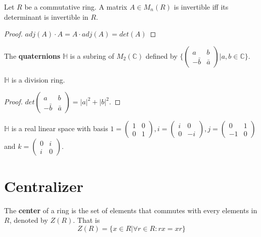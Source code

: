 \documentclass[12pt]{book}
\begin{document}
\begin{lemma}
	Let $R$ be a commutative ring. A matrix $A\in M_n(R)$ is invertible iff its determinant is invertible in $R$.
\end{lemma}
\begin{proof}
	$adj(A)\cdot A=A \cdot adj(A)=det(A)$
\end{proof}

\begin{example}
	The {\bf quaternions} $\mathbb H$ is a subring of $M_2(\mathbb C)$ defined by $\{\begin{pmatrix}
		a&b\\-\bar b&\bar a
	\end{pmatrix}|a,b\in\mathbb C\}$.
\end{example}

\begin{lemma}
	$\mathbb H$ is a division ring.
\end{lemma}
\begin{proof}
	$det \begin{pmatrix}
		a&b\\-\bar b&\bar a
	\end{pmatrix}=|a|^2+|b|^2$.
\end{proof}

\begin{lemma}
	$\mathbb H$ is a real linear space with basis $1=\begin{pmatrix}1&0\\0&1\end{pmatrix}, i=\begin{pmatrix}i&0\\0&-i\end{pmatrix}, j=\begin{pmatrix}0&1\\-1&0\end{pmatrix}$ and $k=\begin{pmatrix}0&i\\i&0\end{pmatrix}$.
\end{lemma}

\section{Centralizer}

\begin{definition}
	The \textbf{center} of a ring is the set of elements that commutes with every elements in $R$, denoted by $Z(R)$. That is
	\begin{equation}
		Z(R)=\{x\in R|\forall r\in R:rx=xr\}
	\end{equation} 
\end{definition}
\end{document}
